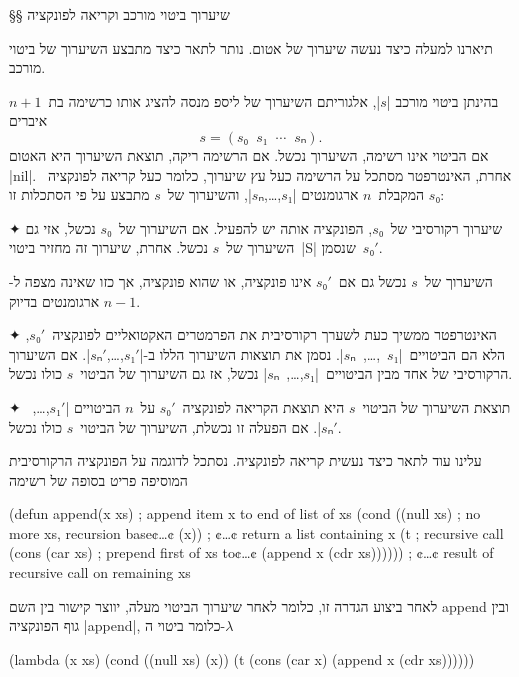 \eject
§§ שיערוך ביטוי מורכב וקריאה לפונקציה

תיארנו למעלה כיצד נעשה שיערוך של אטום. נותר לתאר כיצד מתבצע השיערוך של ביטוי
מורכב.

\minipage\textwidth
\begin{mdframed}[backgroundcolor=Lavender!20]
  בהינתן ביטוי מורכב \E|$s$|, אלגוריתם השיערוך של ליספ מנסה
  להציג אותו כרשימה בת~$n+1$ איברים \[
    s=(s₀\;\;s₁\;\;⋯\;\;sₙ).
\] אם הביטוי אינו רשימה, השיערוך נכשל. אם הרשימה ריקה, תוצאת השיערוך היא האטום
  \T|nil|. אחרת, האינטרפטר מסתכל על הרשימה כעל עץ שיערוך, כלומר כעל קריאה
  לפונקציה~$s₀$ המקבלת~$n$ ארגומנטים \E|$s₁$,…,$sₙ$|, והשיערוך
  של~$s$ מתבצע על פי הסתכלות זו:
  \begin{enumerate}
    ✦ שיערוך רקורסיבי של~$s₀$, הפונקציה אותה יש להפעיל. אם השיערוך של~$s₀$ נכשל,
    אזי גם השיערוך של~$s$ נכשל. אחרת, שיערוך זה מחזיר ביטוי~\E|S| שנסמן~$s₀'$.

    השיערוך של~$s$ נכשל גם אם~$s₀'$ אינו פונקציה, או שהוא פונקציה, אך כזו שאינה
    מצפה ל-$n-1$ ארגומנטים בדיוק.

    ✦ האינטרפטר ממשיך כעת לשערך רקורסיבית את הפרמטרים האקטואליים לפונקציה~$s₀'$,
    הלא הם הביטויים~\E|$s₁$~,…,~$sₙ$|. נסמן את תוצאות השיערוך הללו
    ב-\E|$s₁'$,…,$sₙ'$|. אם השיערוך הרקורסיבי של אחד מבין
    הביטויים~\E|$s₁$,…,~$sₙ$| נכשל, אז גם השיערוך של הביטוי~$s$
    כולו נכשל.

    ✦ תוצאת השיערוך של הביטוי~$s$ היא תוצאת הקריאה לפונקציה~$s₀'$ על~$n$ הביטויים
    \E|$s₁'$,…,~$sₙ'$|. אם הפעלה זו נכשלת, השיערוך של הביטוי~$s$ כולו נכשל.
  \end{enumerate}
\end{mdframed}
\endminipage

עלינו עוד לתאר כיצד נעשית קריאה לפונקציה. נסתכל לדוגמה על הפונקציה הרקורסיבית
המוסיפה פריט בסופה של רשימה
\begin{LISP}
(defun append(x xs) ; append item x to end of list of xs
  (cond ((null xs) ; no more xs, recursion base¢…¢
          (x)) ; ¢…¢ return a list containing x
        (t ; recursive call
          (cons
            (car xs) ; prepend first of xs to¢…¢
            (append x (cdr xs)))))) ; ¢…¢ result of recursive call on remaining xs
\end{LISP}

\minipage\textwidth
לאחר ביצוע הגדרה זו, כלומר לאחר שיערוך הביטוי מעלה, יווצר קישור בין השם append
ובין גוף הפונקציה \E|append|, כלומר ביטוי ה-$λ$
\begin{LISP}
(lambda (x xs)
  (cond ((null xs) (x))
        (t (cons
              (car x)
              (append x (cdr xs))))))
\end{LISP}
\endminipage

